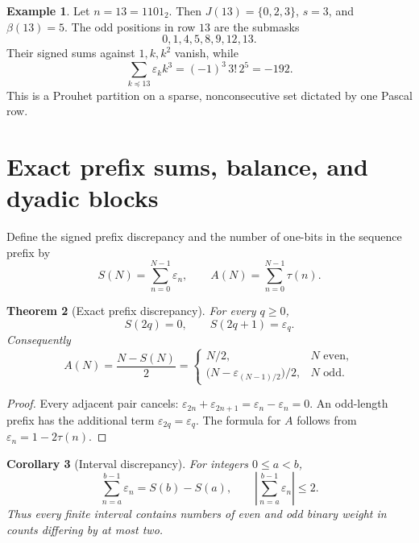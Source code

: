 \documentclass[11pt,oneside]{article}
\newtheorem{theorem}{Theorem}[section]
\newtheorem{corollary}[theorem]{Corollary}
\theoremstyle{definition}
\newtheorem{example}[theorem]{Example}
\theoremstyle{remark}
\newcommand{\eps}{\varepsilon}
\newcommand{\submask}{\preccurlyeq}
\newcommand{\1}{\mathbf 1}
\begin{document}
\begin{example}
Let \(n=13=1101_2\).  Then \(J(13)=\{0,2,3\}\), \(s=3\), and \(\beta(13)=5\).  The odd
positions in row \(13\) are the submasks
\[
 0,1,4,5,8,9,12,13.
\]
Their signed sums against \(1,k,k^2\) vanish, while
\[
 \sum_{k\submask13}\eps_kk^3=(-1)^3\,3!\,2^5=-192.
\]
This is a Prouhet partition on a sparse, nonconsecutive set dictated by one Pascal row.
\end{example}

\section{Exact prefix sums, balance, and dyadic blocks}
\label{sec:prefix}

Define the signed prefix discrepancy and the number of one-bits in the sequence prefix by
\begin{equation}
 S(N)=\sum_{n=0}^{N-1}\eps_n,
 \qquad
 A(N)=\sum_{n=0}^{N-1}\tau(n).
 \label{eq:S-A}
\end{equation}

\begin{theorem}[Exact prefix discrepancy]
\label{thm:prefix}
For every \(q\ge0\),
\begin{equation}
 \boxed{
 S(2q)=0,
 \qquad
 S(2q+1)=\eps_q.}
 \label{eq:prefix-exact}
\end{equation}
Consequently
\begin{equation}
 \boxed{
 A(N)=\frac{N-S(N)}2
 =\begin{cases}
    N/2,&N\text{ even},\\[0.25em]
    \bigl(N-\eps_{(N-1)/2}\bigr)/2,&N\text{ odd}.
  \end{cases}}
 \label{eq:ones-prefix}
\end{equation}
\end{theorem}

\begin{proof}
Every adjacent pair cancels:
\(\eps_{2n}+\eps_{2n+1}=\eps_n-\eps_n=0\).  An odd-length prefix has the additional term
\(\eps_{2q}=\eps_q\).  The formula for \(A\) follows from
\(\eps_n=1-2\tau(n)\).
\end{proof}

\begin{corollary}[Interval discrepancy]
\label{cor:interval-discrepancy}
For integers \(0\le a<b\),
\begin{equation}
 \sum_{n=a}^{b-1}\eps_n=S(b)-S(a),
 \qquad
 \left|\sum_{n=a}^{b-1}\eps_n\right|\le2.
 \label{eq:interval-discrepancy}
\end{equation}
Thus every finite interval contains numbers of even and odd binary weight in counts differing
by at most two.
\end{corollary}
\end{document}
